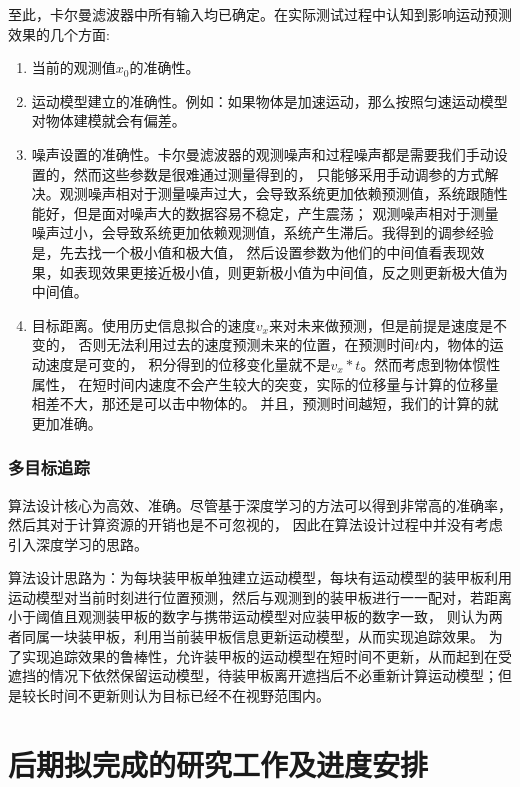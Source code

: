 至此，卡尔曼滤波器中所有输入均已确定。在实际测试过程中认知到影响运动预测效果的几个方面:
\begin{enumerate}[itemsep=2pt,topsep=0pt,parsep=0pt]
    \item 当前的观测值$x_0$的准确性。
    \item 运动模型建立的准确性。例如：如果物体是加速运动，那么按照匀速运动模型对物体建模就会有偏差。
    \item 噪声设置的准确性。卡尔曼滤波器的观测噪声和过程噪声都是需要我们手动设置的，然而这些参数是很难通过测量得到的，
    只能够采用手动调参的方式解决。观测噪声相对于测量噪声过大，会导致系统更加依赖预测值，系统跟随性能好，但是面对噪声大的数据容易不稳定，产生震荡；
    观测噪声相对于测量噪声过小，会导致系统更加依赖观测值，系统产生滞后。我得到的调参经验是，先去找一个极小值和极大值，
    然后设置参数为他们的中间值看表现效果，如表现效果更接近极小值，则更新极小值为中间值，反之则更新极大值为中间值。
    \item 目标距离。使用历史信息拟合的速度$v_x$来对未来做预测，但是前提是速度是不变的，
    否则无法利用过去的速度预测未来的位置，在预测时间$t$内，物体的运动速度是可变的，
    积分得到的位移变化量就不是$v_x*t$。然而考虑到物体惯性属性，
    在短时间内速度不会产生较大的突变，实际的位移量与计算的位移量相差不大，那还是可以击中物体的。
    并且，预测时间越短，我们的计算的就更加准确。
\end{enumerate}

\subsubsection{多目标追踪}
算法设计核心为高效、准确。尽管基于深度学习的方法\citep{zhang2021fairmot,meinhardt2022trackformer,li2019evolution,zhou2020tracking,bewley2016simple}可以得到非常高的准确率，然后其对于计算资源的开销也是不可忽视的，
因此在算法设计过程中并没有考虑引入深度学习的思路。\par
算法设计思路为：为每块装甲板单独建立运动模型，每块有运动模型的装甲板利用运动模型对当前时刻进行位置预测，然后与观测到的装甲板进行一一配对，若距离小于阈值且观测装甲板的数字与携带运动模型对应装甲板的数字一致，
则认为两者同属一块装甲板，利用当前装甲板信息更新运动模型，从而实现追踪效果。
为了实现追踪效果的鲁棒性，允许装甲板的运动模型在短时间不更新，从而起到在受遮挡的情况下依然保留运动模型，待装甲板离开遮挡后不必重新计算运动模型；但是较长时间不更新则认为目标已经不在视野范围内。

\section{后期拟完成的研究工作及进度安排}
